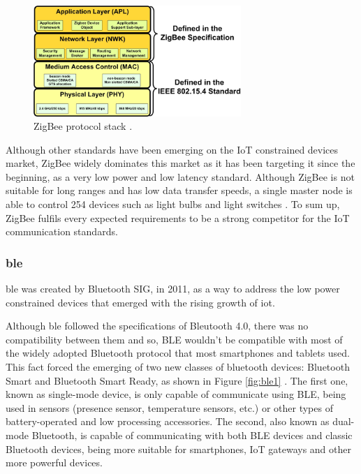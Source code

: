 \begin{figure}[H]
	\centering
	\includegraphics[width=0.7\textwidth]{figures/zig.jpg}
	\caption{ZigBee protocol stack \cite{article}.}
	\label{fig:zig}
\end{figure}


Although other standards have been emerging on the IoT constrained devices market, ZigBee widely dominates this market as it has been targeting it since the beginning, as a very low power and low latency standard.
Although ZigBee is not suitable for long ranges and has low data transfer speeds, a single master node is able to control 254 devices such as light bulbs and light switches \cite{Mehboob2016}. 
To sum up, ZigBee fulfils every expected requirements to be a strong competitor for the IoT communication standards.

\subsubsection{\acf{ble}}

\acf{ble} was created by Bluetooth SIG, in 2011, as a way to address the low power constrained devices that emerged with the rising growth of \ac{iot}. 


Although \ac{ble} followed the specifications of Bleutooth 4.0, there was no compatibility between them and so, BLE wouldn't be compatible with most of the widely adopted Bluetooth protocol that most smartphones and tablets used. This fact forced the emerging of two new classes of bluetooth devices: Bluetooth Smart and Bluetooth Smart Ready, as shown in Figure \ref{fig:ble1} \cite{Andersson2014}. The first one, known as single-mode device, is only capable of communicate using BLE, being used in sensors (presence sensor, temperature sensors, etc.) or other types of battery-operated and low processing accessories. The second, also known as dual-mode Bluetooth, is capable of communicating with both BLE devices and classic Bluetooth devices, being more suitable for smartphones, IoT gateways and other more powerful devices. 

